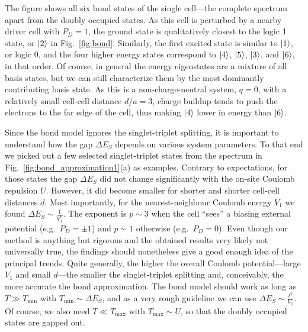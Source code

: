 The figure shows all six bond states of the single cell---the complete spectrum
apart from the doubly occupied states. As this cell is perturbed by a nearby
driver cell with $P_D = 1$, the ground state is qualitatively closest to the
logic 1 state, or $\left|2\right>$ in Fig.~\ref{fig:bond}. Similarly, the first excited
state is similar to $\left|1\right>$, or logic 0, and the four higher energy states
correspond to $\left|4\right>$, $\left|5\right>$, $\left|3\right>$, and $\left|6\right>$, in that order. Of
course, in general the energy eigenstates are a mixture of all basis states, but
we can still characterize them by the most dominantly contributing basis state.
As this is a non-charge-neutral system, $q=0$, with a relatively small cell-cell
distance $d/a = 3$, charge buildup tends to push the electrons to the far edge
of the cell, thus making $\left|4\right>$ lower in energy than $\left|6\right>$.

Since the bond model ignores the singlet-triplet splitting, it is important to
understand how the gap $\Delta E_S$ depends on various system parameters. To
that end we picked out a few selected singlet-triplet states from the spectrum
in Fig.~\ref{fig:bond_approximation1}(a) as examples. Contrary to expectations,
for those states the gap $\Delta E_S$ did not change significantly with the
on-site Coulomb repulsion $U$. However, it did become smaller for shorter and
shorter cell-cell distances $d$. Most importantly, for the nearest-neighbour
Coulomb energy $V_1$ we found $\Delta E_S \sim \frac{1}{V_1^p}$. The exponent is
$p \sim 3$ when the cell ``sees'' a biasing external potential (e.g.\ $P_D = \pm
1$) and $p \sim 1$ otherwise (e.g.\ $P_D = 0$). Even though our method is
anything but rigorous and the obtained results very likely not universally true,
the findings should nonetheless give a good enough idea of the principal trends.
Quite generally, the higher the overall Coulomb potential---large $V_1$ and
small $d$---the smaller the singlet-triplet splitting and, conceivably, the more
accurate the bond approximation. The bond model should work as long as $T \gg
T_{\textrm{min}}$ with $T_{\textrm{min}} \sim \Delta E_S$, and as a very rough
guideline we can use $\Delta E_S \sim \frac{t^2}{V_1}$. Of course, we also need
$T \ll T_{\textrm{max}}$ with $T_{\textrm{max}} \sim U$, so that the doubly
occupied states are gapped out.

